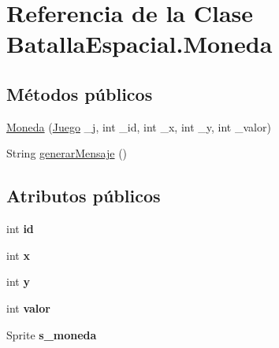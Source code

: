 \hypertarget{classBatallaEspacial_1_1Moneda}{
\section{Referencia de la Clase BatallaEspacial.Moneda}
\label{classBatallaEspacial_1_1Moneda}
}
\subsection*{Métodos públicos}
\begin{DoxyCompactItemize}
\item 
\hyperlink{classBatallaEspacial_1_1Moneda_a19446852af09b6e2aaf3de1d65609c0e}{Moneda} (\hyperlink{classBatallaEspacial_1_1Juego}{Juego} \_\-j, int \_\-id, int \_\-x, int \_\-y, int \_\-valor)
\item 
String \hyperlink{classBatallaEspacial_1_1Moneda_a8ca2f3a7d6bb712dbd145442ab2f3c5f}{generarMensaje} ()
\end{DoxyCompactItemize}
\subsection*{Atributos públicos}
\begin{DoxyCompactItemize}
\item 
\hypertarget{classBatallaEspacial_1_1Moneda_a8ce4ba25109e1f32dee2754885acfc52}{
int {\bfseries id}}
\label{classBatallaEspacial_1_1Moneda_a8ce4ba25109e1f32dee2754885acfc52}

\item 
\hypertarget{classBatallaEspacial_1_1Moneda_ab553ded4797748974b843c01c5624611}{
int {\bfseries x}}
\label{classBatallaEspacial_1_1Moneda_ab553ded4797748974b843c01c5624611}

\item 
\hypertarget{classBatallaEspacial_1_1Moneda_acf7ef2c80589be7ba4c7d1e17e2eb07a}{
int {\bfseries y}}
\label{classBatallaEspacial_1_1Moneda_acf7ef2c80589be7ba4c7d1e17e2eb07a}

\item 
\hypertarget{classBatallaEspacial_1_1Moneda_a27759fbfad26176dde347b829136b4ef}{
int {\bfseries valor}}
\label{classBatallaEspacial_1_1Moneda_a27759fbfad26176dde347b829136b4ef}

\item 
\hypertarget{classBatallaEspacial_1_1Moneda_ae0687cdc1c7e039c2bceef5e9486ce0c}{
Sprite {\bfseries s\_\-moneda}}
\label{classBatallaEspacial_1_1Moneda_ae0687cdc1c7e039c2bceef5e9486ce0c}

\end{DoxyCompactItemize}
